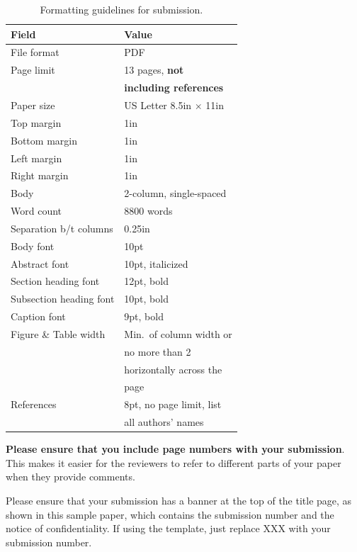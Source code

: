 \documentclass[pageno]{jpaper}
\begin{document}
\begin{table}[h!]
  \centering
  \begin{tabular}{|l|l|}
    \hline
    \textbf{Field} & \textbf{Value}\\
    \hline
    \hline
    File format & PDF \\
    \hline
    Page limit & 13 pages, {\bf not }\\
               & {\bf including references}\\
    \hline
    Paper size & US Letter 8.5in $\times$ 11in\\
    \hline
    Top margin & 1in\\
    \hline
    Bottom margin & 1in\\
    \hline
    Left margin & 1in\\
    \hline
    Right margin & 1in\\
    \hline
    Body & 2-column, single-spaced\\
    \hline
    Word count & 8800 words\\
    \hline    
    Separation b/t columns & 0.25in\\
    \hline
    Body font & 10pt\\
    \hline
    Abstract font & 10pt, italicized\\
    \hline
    Section heading font & 12pt, bold\\
    \hline
    Subsection heading font & 10pt, bold\\
    \hline
    Caption font & 9pt, bold\\
    \hline
    Figure \& Table width & Min.~of column width or  \\
    & no more than 2    \\
    &  horizontally across the \\
    & page \\
    \hline
    References & 8pt, no page limit, list \\
               & all authors' names\\
    \hline
  \end{tabular}
  \caption{Formatting guidelines for submission. }
  \label{table:formatting}
\end{table}

\textbf{Please ensure that you include page numbers with your
submission}. This makes it easier for the reviewers to refer to different
parts of your paper when they provide comments.

Please ensure that your submission has a banner at the top of the title
page, as shown in
this
sample paper, which contains the submission number and the notice of
confidentiality.  If using the template, just replace XXX with your
submission number.
\end{document}
